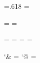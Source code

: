 \def\commdiagbaselines{\baselineskip15pt \lineskip3pt \lineskiplimit3pt }%
\def\gridcommdiag#1{\null\,
  \vcenter{\offinterlineskip
  \m@th\ialign{&\vbox to\vgrid{\vss
    \hbox to\hgrid{\hss\smash{$##$}\hss}}\crcr
      \mathstrut\crcr\noalign{\kern-\vgrid}
      #1\crcr\mathstrut\crcr\noalign{\kern-.5\vgrid}}}\,}%

\newdimen\harrowlength \harrowlength=60pt
\newdimen\varrowlength \varrowlength=.618\harrowlength
\newdimen\sarrowlength \sarrowlength=\harrowlength

\newdimen\hmorphposn \hmorphposn=\z@
\newdimen\vmorphposn \vmorphposn=\z@
\newdimen\morphdist  \morphdist=4pt

\dimendef{}       %
\dimendef{}       %

\newdimen\hmorphposnrt  \hmorphposnrt=\z@
\newdimen\hmorphposnlft \hmorphposnlft=\z@
\newdimen\vmorphposnrt  \vmorphposnrt=\z@
\newdimen\vmorphposnlft \vmorphposnlft=\z@
\let\hmorphposnup=\hmorphposnrt
\let\hmorphposndn=\hmorphposnlft
\let\vmorphposnup=\vmorphposnrt
\let\vmorphposndn=\vmorphposnlft

\newdimen\hgrid \hgrid=15pt
\newdimen\vgrid \vgrid=15pt

\newdimen\hchannel  \hchannel=0pt
\newdimen\vchannel  \vchannel=0pt
\newdimen\channelwidth \channelwidth=3pt

\dimendef{}         %
\dimendef{}         %

\catcode`& = \@oldandcatcode
\catcode`@ = \@oldatcatcode



